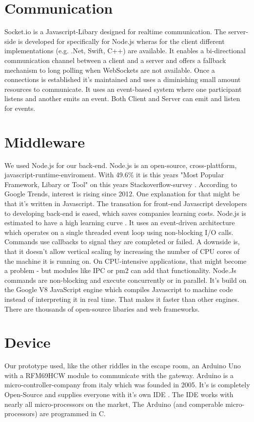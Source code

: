 \section{Communication}
Socket.io is a Javascript-Libary designed for realtime communication. 
The server-side is developed for specifically for Node.js wheras for the client different implementations (e.g. .Net, Swift, C++)\parencite{socketioClients} are available.
It enables a bi-directional communication channel between a client and a server and offers a fallback mechanism to long polling when WebSockets are not available.
Once a connections is established it's maintained and uses a diminishing small amount resources to communicate. 
It uses an event-based system where one participant listens and another emits an event. 
Both Client and Server can emit and listen for events.
\section{Middleware}
We used Node.js for our back-end. 
Node.js is an open-source, cross-plattform, javascript-runtime-enviroment. 
With 49.6\% it is this years "Most Popular Framework, Libary or Tool" on this years Stackoverflow-survey \parencite{stackOverflowSurvey}.
According to Google Trends, interest is rising since 2012\parencite{gogleTrendNode}.
One explanation for that might be that it's written in Javascript. 
The transation for front-end Javascript developers to developing back-end is eased, which saves companies learning costs.
Node.js is estimated to have a high learning curve \parencite{nodeLearningcurve}.
It uses an event-driven architecture which operates on a single threaded event loop using non-blocking I/O calls.
Commands use callbacks to signal they are completed or failed. 
A downside is, that it doesn't allow vertical scaling by increasing the number of CPU cores of the machine it is running on. 
On CPU-intensive applications, that might become a problem - but modules like IPC or pm2 can add that functionality.
Node.Js commands are non-blocking and execute concurrently or in parallel. 
It's build on the Google V8 JavaScript engine which compiles Javascript to machine code instead of interpreting it in real time. 
That makes it faster than other engines.
There are thousands of open-source libaries and web frameworks. 
\section{Device}
Our prototype used, like the other riddles in the escape room, an Arduino Uno with a RFM69HCW module to communicate with the gateway. 
Arduino is a micro-controller-company from italy which was founded in 2005. It's is completely Open-Source and supplies everyone with it's own IDE \parencite{arduinoIDEDownload}.
The IDE works with nearly all micro-processors on the market, %
The Arduino (and comperable micro-processors) are programmed in C. 
